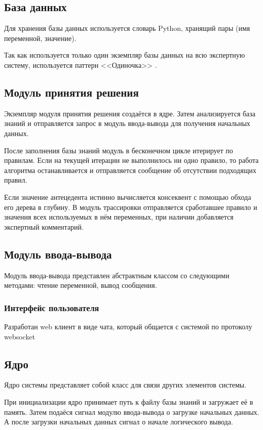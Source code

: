 \subsection{База данных}

Для хранения базы данных используется словарь Python, хранящий пары (имя переменной, значение).

Так как используется только один экземпляр базы данных на всю экспертную систему, используется паттерн <<Одиночка>> \cite{gammaDesignPatternsElements1995}.

\subsection{Модуль принятия решения}

Экземпляр модуля принятия решения создаётся в ядре.
Затем анализируется база знаний и отправляется запрос в модуль ввода-вывода для получения начальных данных.

После заполнения базы знаний модуль в бесконечном цикле итерирует по правилам.
Если на текущей итерации не  выполнилось ни одно правило, то работа алгоритма останавливается и отправляется сообщение об отсутствии подходящих правил.

Если значение антецедента истинно вычисляется консеквент с помощью обхода его дерева в глубину.
В модуль трассировки отправляется  сработавшее правило и значения всех используемых в нём переменных, при наличии добавляется экспертный комментарий.

\subsection{Модуль ввода-вывода}

Модуль ввода-вывода представлен абстрактным классом со следующими методами: чтение переменной, вывод сообщения.

\subsubsection{Интерфейс пользователя}

Разработан web клиент в виде чата, который общается с системой по протоколу websocket

\subsection{Ядро}

Ядро системы представляет собой класс для связи других элементов системы.

При инициализации ядро принимает путь к файлу базы знаний и загружает её в память.
Затем подаёся сигнал модулю ввода-вывода о загрузке начальных данных.
А после загрузки начальных данных сигнал о начале логического вывода.